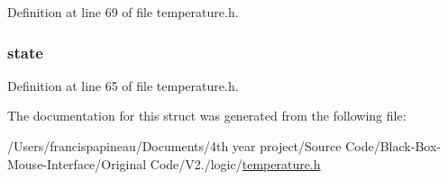 \-Definition at line 69 of file temperature.\-h.

\hypertarget{structtemp_ac6b2518df4ca45cee089e61f152572b2}{
\subsubsection[{state}]{ {\bf state}}}\label{structtemp_ac6b2518df4ca45cee089e61f152572b2}


\-Definition at line 65 of file temperature.\-h.



\-The documentation for this struct was generated from the following file\-:\begin{DoxyCompactItemize}
\item 
/\-Users/francispapineau/\-Documents/4th year project/\-Source Code/\-Black-\/\-Box-\/\-Mouse-\/\-Interface/\-Original Code/\-V2./logic/\hyperlink{temperature_8h}{temperature.\-h}\end{DoxyCompactItemize}
